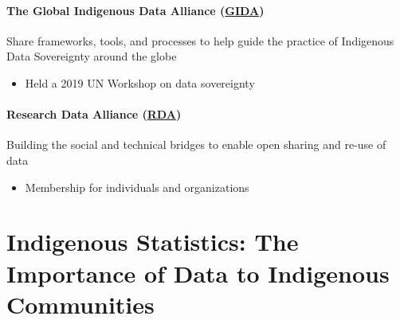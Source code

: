 \documentclass[
]{book}
\providecommand{\tightlist}{%
  \setlength{\itemsep}{0pt}\setlength{\parskip}{0pt}}
\begin{document}
\hypertarget{the-global-indigenous-data-alliance-gida}{%
\subsubsection*{\texorpdfstring{The Global Indigenous Data Alliance (\href{https://www.gida-global.org/}{GIDA})}{The Global Indigenous Data Alliance (GIDA)}}\label{the-global-indigenous-data-alliance-gida}}

Share frameworks, tools, and processes to help guide the practice of Indigenous Data Sovereignty around the globe

\begin{itemize}
\tightlist
\item
  Held a 2019 UN Workshop on data sovereignty
\end{itemize}

\hypertarget{research-data-alliance-rda}{%
\subsubsection*{\texorpdfstring{Research Data Alliance (\href{https://www.rd-alliance.org/groups/international-indigenous-data-sovereignty-ig}{RDA})}{Research Data Alliance (RDA)}}\label{research-data-alliance-rda}}

Building the social and technical bridges to enable open sharing and re-use of data

\begin{itemize}
\tightlist
\item
  Membership for individuals and organizations
\end{itemize}

\hypertarget{indigenous-statistics-the-importance-of-data-to-indigenous-communities}{%
\chapter{Indigenous Statistics: The Importance of Data to Indigenous Communities}\label{indigenous-statistics-the-importance-of-data-to-indigenous-communities}}
\end{document}
